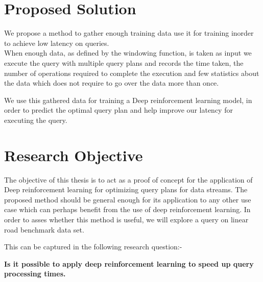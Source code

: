 \section{Proposed Solution}
We propose a method to gather enough training data use it for training inorder to achieve low latency on queries.\\
When enough data, as defined by the windowing function, is taken as input we execute the query with multiple query plans and records the time taken, the number of operations required to complete the execution and few statistics about the data which does not require to go over the data more than once.
\par We use this gathered data for training a Deep reinforcement learning model, in order to predict the optimal query plan and help improve our latency for executing the query.  


\section{Research Objective}
The objective of this thesis is to act as a proof of concept for the application of Deep reinforcement learning for optimizing query plans for data streams. The proposed method should be general enough for its application to any other use case which can perhaps benefit from the use of deep reinforcement learning. In order to asses whether this method is useful, we will explore a query on linear road benchmark data set.
\par  This can be captured in the following research question:-
\begin{center}
    \textbf{Is it possible to apply deep reinforcement learning to speed up query processing times.}
\end{center}

